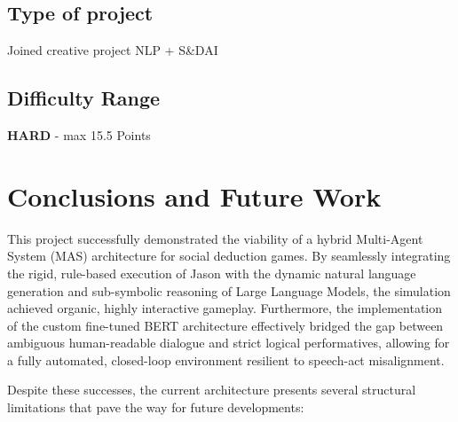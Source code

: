\documentclass[12pt]{article}
\begin{document}
\subsection{Type of project}
\label{subsec:kind}
Joined creative project NLP + S\&DAI


\subsection{Difficulty Range}
\label{subsec:points}
\textbf{HARD} - max 15.5 Points

\tableofcontents















\section{Conclusions and Future Work}
\label{sec:conclusions}

This project successfully demonstrated the viability of a hybrid Multi-Agent System (MAS) architecture for social deduction games. By seamlessly integrating the rigid, rule-based execution of Jason with the dynamic natural language generation and sub-symbolic reasoning of Large Language Models, the simulation achieved organic, highly interactive gameplay. Furthermore, the implementation of the custom fine-tuned BERT architecture effectively bridged the gap between ambiguous human-readable dialogue and strict logical performatives, allowing for a fully automated, closed-loop environment resilient to speech-act misalignment.

Despite these successes, the current architecture presents several structural limitations that pave the way for future developments:
\end{document}
